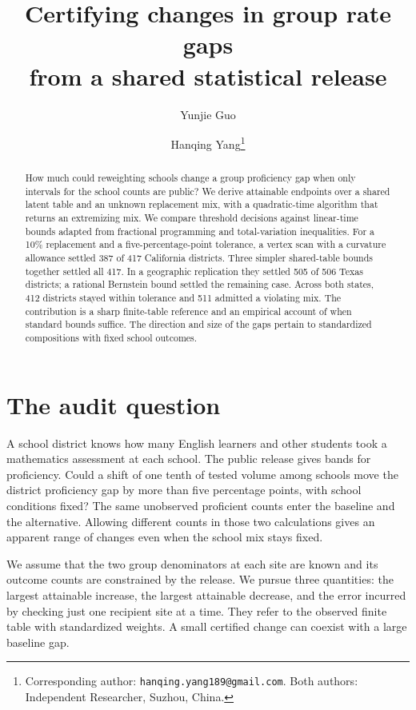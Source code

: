 \documentclass[11pt]{article}
\title{Certifying changes in group rate gaps\\from a shared statistical release}
\author{Yunjie Guo \and Hanqing Yang\thanks{Corresponding author: \texttt{hanqing.yang189@gmail.com}. Both authors: Independent Researcher, Suzhou, China.}}
\date{}
\begin{document}
\maketitle
\begin{abstract}
How much could reweighting schools change a group proficiency gap when only intervals for the school counts are public? We derive attainable endpoints over a shared latent table and an unknown replacement mix, with a quadratic-time algorithm that returns an extremizing mix. We compare threshold decisions against linear-time bounds adapted from fractional programming and total-variation inequalities. For a 10\% replacement and a five-percentage-point tolerance, a vertex scan with a curvature allowance settled 387 of 417 California districts. Three simpler shared-table bounds together settled all 417. In a geographic replication they settled 505 of 506 Texas districts; a rational Bernstein bound settled the remaining case. Across both states, 412 districts stayed within tolerance and 511 admitted a violating mix. The contribution is a sharp finite-table reference and an empirical account of when standard bounds suffice. The direction and size of the gaps pertain to standardized compositions with fixed school outcomes.
\end{abstract}

\section{The audit question}
A school district knows how many English learners and other students took a mathematics assessment at each school. The public release gives bands for proficiency. Could a shift of one tenth of tested volume among schools move the district proficiency gap by more than five percentage points, with school conditions fixed? The same unobserved proficient counts enter the baseline and the alternative. Allowing different counts in those two calculations gives an apparent range of changes even when the school mix stays fixed.

We assume that the two group denominators at each site are known and its outcome counts are constrained by the release. We pursue three quantities: the largest attainable increase, the largest attainable decrease, and the error incurred by checking just one recipient site at a time. They refer to the observed finite table with standardized weights. A small certified change can coexist with a large baseline gap.
\end{document}
